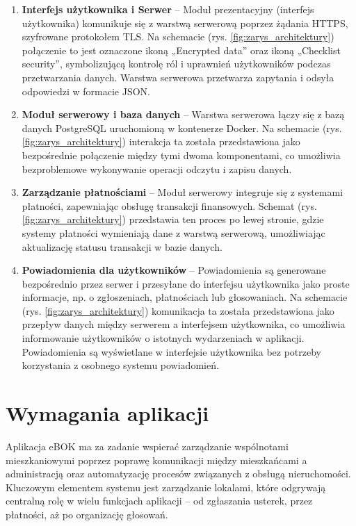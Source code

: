 \begin{enumerate}[label=\arabic*.]

	\item \textbf{Interfejs użytkownika i Serwer} – Moduł prezentacyjny (interfejs użytkownika) komunikuje się z warstwą serwerową poprzez żądania HTTPS, szyfrowane protokołem TLS. Na schemacie (rys. \ref{fig:zarys_architektury}) połączenie to jest oznaczone ikoną „Encrypted data” oraz ikoną „Checklist security”, symbolizującą kontrolę ról i uprawnień użytkowników podczas przetwarzania danych. Warstwa serwerowa przetwarza zapytania i odsyła odpowiedzi w formacie JSON.

	\item \textbf{Moduł serwerowy i baza danych} – Warstwa serwerowa łączy się z bazą danych PostgreSQL uruchomioną w kontenerze Docker. Na schemacie (rys. \ref{fig:zarys_architektury}) interakcja ta została przedstawiona jako bezpośrednie połączenie między tymi dwoma komponentami, co umożliwia bezproblemowe wykonywanie operacji odczytu i zapisu danych.

	\item \textbf{Zarządzanie płatnościami} – Moduł serwerowy integruje się z systemami płatności, zapewniając obsługę transakcji finansowych. Schemat (rys. \ref{fig:zarys_architektury}) przedstawia ten proces po lewej stronie, gdzie systemy płatności wymieniają dane z warstwą serwerową, umożliwiając aktualizację statusu transakcji w bazie danych.

	\item \textbf{Powiadomienia dla użytkowników} – Powiadomienia są generowane bezpośrednio przez serwer i przesyłane do interfejsu użytkownika jako proste informacje, np. o zgłoszeniach, płatnościach lub głosowaniach. Na schemacie (rys. \ref{fig:zarys_architektury}) komunikacja ta została przedstawiona jako przepływ danych między serwerem a interfejsem użytkownika, co umożliwia informowanie użytkowników o istotnych wydarzeniach w aplikacji. Powiadomienia są wyświetlane w interfejsie użytkownika bez potrzeby korzystania z osobnego systemu powiadomień.

	
\end{enumerate}


\section{Wymagania aplikacji}

Aplikacja eBOK ma za zadanie wspierać zarządzanie wspólnotami mieszkaniowymi poprzez poprawę komunikacji między mieszkańcami a administracją oraz automatyzację procesów związanych z obsługą nieruchomości. Kluczowym elementem systemu jest zarządzanie lokalami, które odgrywają centralną rolę w wielu funkcjach aplikacji – od zgłaszania usterek, przez płatności, aż po organizację głosowań.

